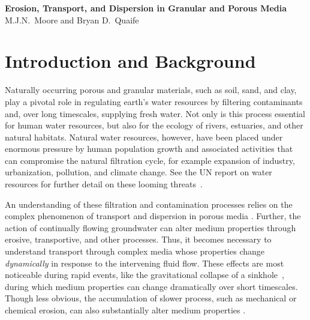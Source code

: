 \documentclass[11pt]{article}
\begin{document}
\begin{center}
{\large \bf Erosion, Transport, and Dispersion in Granular
and Porous Media} 
\\
M.J.N.~Moore and Bryan D.~Quaife
\end{center}


\section{Introduction and Background}
Naturally occurring porous and granular materials, such as soil, sand, and clay, play a pivotal role in regulating earth's water resources by filtering contaminants and, over long timescales, supplying fresh water.  Not only is this process essential for human water resources, but also for the ecology of rivers, estuaries, and other natural habitats.  Natural water resources, however, have been placed under enormous pressure by human population growth and associated activities that can compromise the natural filtration cycle, for example expansion of industry, urbanization, pollution, and climate change. See the UN report on water resources for further detail on these looming threats~\cite{UNwater}.

An understanding of these filtration and contamination processes relies on the complex phenomenon of transport and dispersion in porous media \cite{scheidegger1961general, neuman1987stochastic, delgado2007longitudinal, zhang2016backward}. Further, the action of continually flowing groundwater can alter medium properties through erosive, transportive, and other processes. Thus, it becomes necessary to understand transport through complex media whose properties change {\em dynamically} in response to the intervening fluid flow. These effects are most noticeable during rapid events, like the gravitational collapse of a sinkhole~\cite{sandhu2018fate}, during which medium properties can change dramatically over short timescales. Though less obvious, the accumulation of slower process, such as mechanical or chemical erosion, can also substantially alter medium properties \cite{szymczak2009wormhole, ellis2013dissolution}.  
\end{document}
